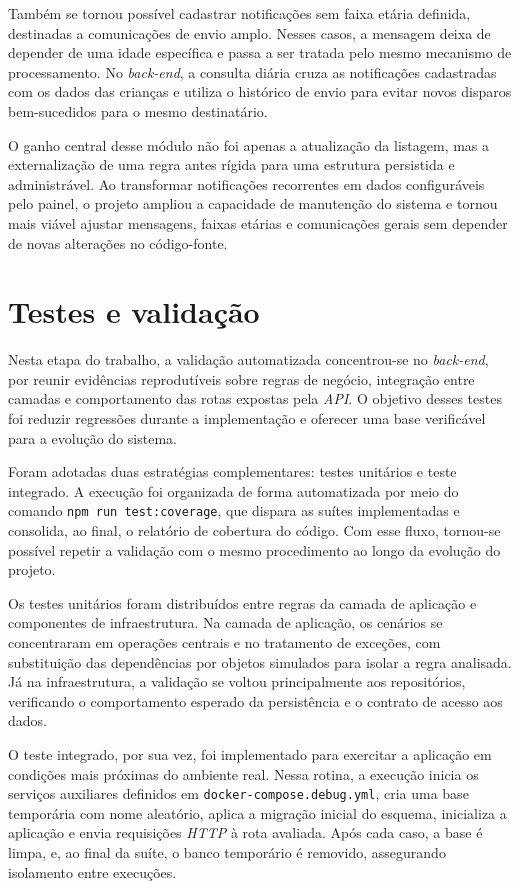Também se tornou possível cadastrar notificações sem faixa etária definida, destinadas a comunicações de envio amplo. Nesses casos, a mensagem deixa de depender de uma idade específica e passa a ser tratada pelo mesmo mecanismo de processamento. No \emph{back-end}, a consulta diária cruza as notificações cadastradas com os dados das crianças e utiliza o histórico de envio para evitar novos disparos bem-sucedidos para o mesmo destinatário.

O ganho central desse módulo não foi apenas a atualização da listagem, mas a externalização de uma regra antes rígida para uma estrutura persistida e administrável. Ao transformar notificações recorrentes em dados configuráveis pelo painel, o projeto ampliou a capacidade de manutenção do sistema e tornou mais viável ajustar mensagens, faixas etárias e comunicações gerais sem depender de novas alterações no código-fonte.

\section{Testes e validação}

Nesta etapa do trabalho, a validação automatizada concentrou-se no \emph{back-end}, por reunir evidências reprodutíveis sobre regras de negócio, integração entre camadas e comportamento das rotas expostas pela \emph{API}. O objetivo desses testes foi reduzir regressões durante a implementação e oferecer uma base verificável para a evolução do sistema.

Foram adotadas duas estratégias complementares: testes unitários e teste integrado. A execução foi organizada de forma automatizada por meio do comando \texttt{npm run test:coverage}, que dispara as suítes implementadas e consolida, ao final, o relatório de cobertura do código. Com esse fluxo, tornou-se possível repetir a validação com o mesmo procedimento ao longo da evolução do projeto.

Os testes unitários foram distribuídos entre regras da camada de aplicação e componentes de infraestrutura. Na camada de aplicação, os cenários se concentraram em operações centrais e no tratamento de exceções, com substituição das dependências por objetos simulados para isolar a regra analisada. Já na infraestrutura, a validação se voltou principalmente aos repositórios, verificando o comportamento esperado da persistência e o contrato de acesso aos dados.

O teste integrado, por sua vez, foi implementado para exercitar a aplicação em condições mais próximas do ambiente real. Nessa rotina, a execução inicia os serviços auxiliares definidos em \texttt{docker-compose.debug.yml}, cria uma base temporária com nome aleatório, aplica a migração inicial do esquema, inicializa a aplicação e envia requisições \emph{HTTP} à rota avaliada. Após cada caso, a base é limpa, e, ao final da suíte, o banco temporário é removido, assegurando isolamento entre execuções.

